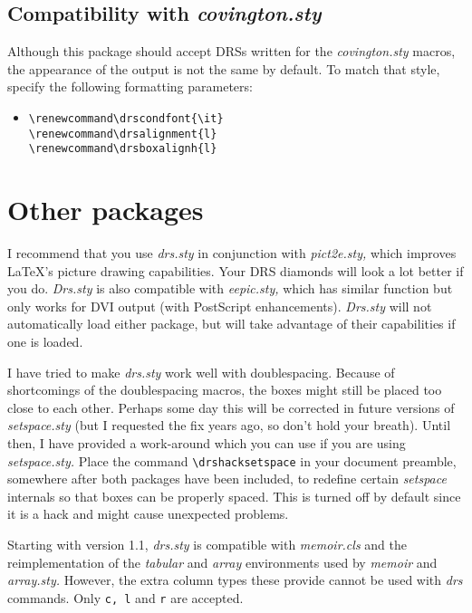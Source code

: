 \documentclass[11pt]{article}
\begin{document}
\subsection{Compatibility with \emph{covington.sty}}

Although this package should accept DRSs written for the \emph{covington.sty}
macros, the appearance of the output is not the same by default.  To match
that style, specify the following formatting parameters:

\begin{itemize}
\item[]
\begin{verbatim}
\renewcommand\drscondfont{\it} 
\renewcommand\drsalignment{l}   
\renewcommand\drsboxalignh{l}       
\end{verbatim}
\end{itemize}


\section{Other packages}

I recommend that you use \emph{drs.sty} in conjunction with \emph{pict2e.sty,}
which improves \LaTeX's picture drawing capabilities.  Your DRS diamonds will look a lot
better if you do. \emph{Drs.sty} is also compatible with \emph{eepic.sty,} which has similar
function but only works for DVI output (with PostScript enhancements). \emph{Drs.sty} will not
automatically load either package, but will take advantage of their capabilities if one is  loaded.

I have tried to make \emph{drs.sty} work well with doublespacing.  Because of
shortcomings of the doublespacing macros, the boxes might still be placed
too close to each other.  Perhaps some day this will be corrected in future versions
of \emph{setspace.sty} (but I requested the fix years ago, so don't hold your breath).  Until then, I have provided a work-around which you
can use if you are using \emph{setspace.sty.}  Place the command
\verb|\drshacksetspace| in your document preamble, somewhere after both packages
have been included, to redefine certain \emph{setspace} internals so that
boxes can be properly spaced.   This is turned off by default since it
is a hack and might cause unexpected problems.

Starting with version 1.1, \emph{drs.sty} is compatible with \emph{memoir.cls} and the reimplementation of the \emph{tabular} and \emph{array} environments used by \emph{memoir} and \emph{array.sty.} However, the extra column types these provide cannot be used with \emph{drs} commands. Only {\tt c, l} and {\tt r} are accepted.
\end{document}
